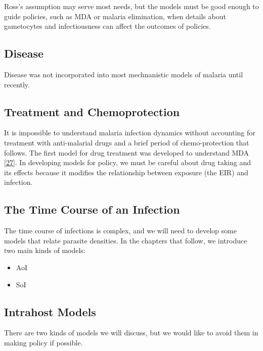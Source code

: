 \documentclass[
]{book}
\begin{document}
Ross's assumption may serve most needs, but the models must be good enough to guide policies, such as MDA or malaria elimination, when details about gametocytes and infectiousness can affect the outcomes of policies.

\hypertarget{disease}{%
\subsection{Disease}\label{disease}}

Disease was not incorporated into most mechnanistic models of malaria until recently.

\hypertarget{treatment-and-chemoprotection}{%
\subsection{Treatment and Chemoprotection}\label{treatment-and-chemoprotection}}

It is impossible to understand malaria infection dynamics without accounting for treatment with anti-malarial drugs and a brief period of chemo-protection that follows. The first model for drug treatment was developed to understand MDA {[}\protect\hyperlink{ref-DietzK1975ModelsParasitic}{27}{]}. In developing models for policy, we must be careful about drug taking and its effects because it modifies the relationship between exposure (the EIR) and infection.

\hypertarget{the-time-course-of-an-infection}{%
\subsection{The Time Course of an Infection}\label{the-time-course-of-an-infection}}

The time course of infections is complex, and we will need to develop some models that relate parasite densities. In the chapters that follow, we introduce two main kinds of models:

\begin{itemize}
\item
  AoI
\item
  SoI
\end{itemize}

\hypertarget{intrahost-models}{%
\subsection{Intrahost Models}\label{intrahost-models}}

There are two kinds of models we will discuss, but we would like to avoid them in making policy if possible.
\end{document}

